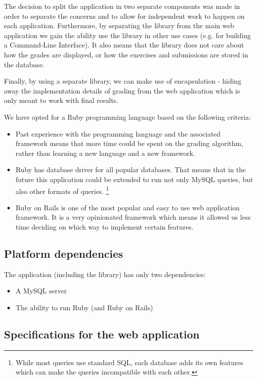 The decision to split the application in two separate components was made in order to separate the concerns and to allow for independent work to happen on each application. Furthermore, by separating the library from the main web application we gain the ability use the library in other use cases (e.g. for building a Command-Line Interface). It also means that the library does not care about how the grades are displayed, or how the exercises and submissions are stored in the database.

Finally, by using a separate library, we can make use of encapsulation - hiding away the implementation details of grading from the web application which is only meant to work with final results.

We have opted for a Ruby programming language based on the following criteria:

\begin{itemize}
    \item Past experience with the programming language and the associated framework means that more time could be spent on the grading algorithm, rather than learning a new language and a new framework.
    \item Ruby has database driver for all popular databases. That means that in the future this application could be extended to run not only MySQL queries, but also other formats of queries. \footnote{While most queries use standard SQL, each database adds its own features which can make the queries incompatible with each other.}
    \item Ruby on Rails is one of the most popular and easy to use web application framework. It is a very opinionated framework which means it allowed us less time deciding on which way to implement certain features.
\end{itemize}

\subsection{Platform dependencies}

The application (including the library) has only two dependencies:
\begin{itemize}
    \item A MySQL server
    \item The ability to run Ruby (and Ruby on Rails)
\end{itemize}

\subsection{Specifications for the web application}

